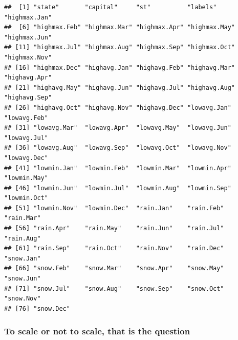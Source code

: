 \documentclass[
]{article}
\newenvironment{Shaded}{\begin{snugshade}}{\end{snugshade}}
\newcommand{\CommentTok}[1]{\textcolor[rgb]{0.56,0.35,0.01}{\textit{#1}}}
\newcommand{\DecValTok}[1]{\textcolor[rgb]{0.00,0.00,0.81}{#1}}
\newcommand{\KeywordTok}[1]{\textcolor[rgb]{0.13,0.29,0.53}{\textbf{#1}}}
\newcommand{\NormalTok}[1]{#1}
\newcommand{\OperatorTok}[1]{\textcolor[rgb]{0.81,0.36,0.00}{\textbf{#1}}}
\newcommand{\StringTok}[1]{\textcolor[rgb]{0.31,0.60,0.02}{#1}}
\begin{document}
\begin{verbatim}
##  [1] "state"       "capital"     "st"          "labels"      "highmax.Jan"
##  [6] "highmax.Feb" "highmax.Mar" "highmax.Apr" "highmax.May" "highmax.Jun"
## [11] "highmax.Jul" "highmax.Aug" "highmax.Sep" "highmax.Oct" "highmax.Nov"
## [16] "highmax.Dec" "highavg.Jan" "highavg.Feb" "highavg.Mar" "highavg.Apr"
## [21] "highavg.May" "highavg.Jun" "highavg.Jul" "highavg.Aug" "highavg.Sep"
## [26] "highavg.Oct" "highavg.Nov" "highavg.Dec" "lowavg.Jan"  "lowavg.Feb" 
## [31] "lowavg.Mar"  "lowavg.Apr"  "lowavg.May"  "lowavg.Jun"  "lowavg.Jul" 
## [36] "lowavg.Aug"  "lowavg.Sep"  "lowavg.Oct"  "lowavg.Nov"  "lowavg.Dec" 
## [41] "lowmin.Jan"  "lowmin.Feb"  "lowmin.Mar"  "lowmin.Apr"  "lowmin.May" 
## [46] "lowmin.Jun"  "lowmin.Jul"  "lowmin.Aug"  "lowmin.Sep"  "lowmin.Oct" 
## [51] "lowmin.Nov"  "lowmin.Dec"  "rain.Jan"    "rain.Feb"    "rain.Mar"   
## [56] "rain.Apr"    "rain.May"    "rain.Jun"    "rain.Jul"    "rain.Aug"   
## [61] "rain.Sep"    "rain.Oct"    "rain.Nov"    "rain.Dec"    "snow.Jan"   
## [66] "snow.Feb"    "snow.Mar"    "snow.Apr"    "snow.May"    "snow.Jun"   
## [71] "snow.Jul"    "snow.Aug"    "snow.Sep"    "snow.Oct"    "snow.Nov"   
## [76] "snow.Dec"
\end{verbatim}

\begin{Shaded}
\end{Shaded}

\hypertarget{to-scale-or-not-to-scale-that-is-the-question}{%
\subsubsection{To scale or not to scale, that is the
question}\label{to-scale-or-not-to-scale-that-is-the-question}}
\end{document}
